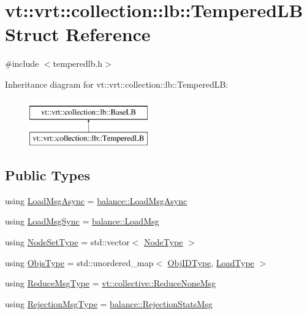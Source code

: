 \hypertarget{structvt_1_1vrt_1_1collection_1_1lb_1_1_tempered_l_b}{}\section{vt\+:\+:vrt\+:\+:collection\+:\+:lb\+:\+:Tempered\+LB Struct Reference}
\label{structvt_1_1vrt_1_1collection_1_1lb_1_1_tempered_l_b}


{\ttfamily \#include $<$temperedlb.\+h$>$}

Inheritance diagram for vt\+:\+:vrt\+:\+:collection\+:\+:lb\+:\+:Tempered\+LB\+:\begin{figure}[H]
\begin{center}
\leavevmode
\includegraphics[height=2.000000cm]{structvt_1_1vrt_1_1collection_1_1lb_1_1_tempered_l_b}
\end{center}
\end{figure}
\subsection*{Public Types}
\begin{DoxyCompactItemize}
\item 
using \hyperlink{structvt_1_1vrt_1_1collection_1_1lb_1_1_tempered_l_b_a38d9ad7e92612cdbdf564b6f49b516a7}{Load\+Msg\+Async} = \hyperlink{structvt_1_1vrt_1_1collection_1_1balance_1_1_load_msg_async}{balance\+::\+Load\+Msg\+Async}
\item 
using \hyperlink{structvt_1_1vrt_1_1collection_1_1lb_1_1_tempered_l_b_aa46eb8cbc4c505f35b970f75e38b5e0d}{Load\+Msg\+Sync} = \hyperlink{structvt_1_1vrt_1_1collection_1_1balance_1_1_load_msg}{balance\+::\+Load\+Msg}
\item 
using \hyperlink{structvt_1_1vrt_1_1collection_1_1lb_1_1_tempered_l_b_aa18a0edaf10119e307e7209371caa673}{Node\+Set\+Type} = std\+::vector$<$ \hyperlink{namespacevt_a866da9d0efc19c0a1ce79e9e492f47e2}{Node\+Type} $>$
\item 
using \hyperlink{structvt_1_1vrt_1_1collection_1_1lb_1_1_tempered_l_b_ad54faf59319f1b33dec689ee853d688e}{Objs\+Type} = std\+::unordered\+\_\+map$<$ \hyperlink{structvt_1_1vrt_1_1collection_1_1lb_1_1_base_l_b_a790b22acf448880599724749cdc4e9b3}{Obj\+I\+D\+Type}, \hyperlink{structvt_1_1vrt_1_1collection_1_1lb_1_1_base_l_b_a215e22b9f12678303f49615ae3be05cc}{Load\+Type} $>$
\item 
using \hyperlink{structvt_1_1vrt_1_1collection_1_1lb_1_1_tempered_l_b_a3e688a286b16334d43666bae581231b7}{Reduce\+Msg\+Type} = \hyperlink{namespacevt_1_1collective_aa439a90f05078f2bcf918641c951946f}{vt\+::collective\+::\+Reduce\+None\+Msg}
\item 
using \hyperlink{structvt_1_1vrt_1_1collection_1_1lb_1_1_tempered_l_b_af1c8105006c9150e33347c66018e143e}{Rejection\+Msg\+Type} = \hyperlink{structvt_1_1vrt_1_1collection_1_1balance_1_1_rejection_stats_msg}{balance\+::\+Rejection\+Stats\+Msg}
\end{DoxyCompactItemize}
